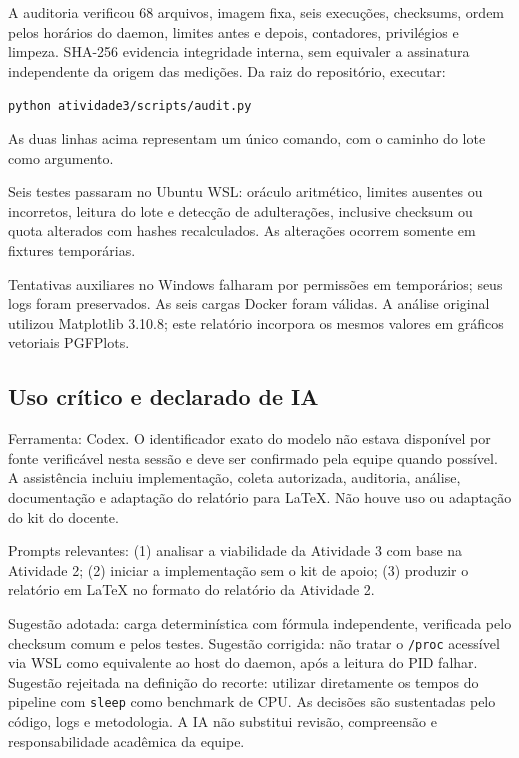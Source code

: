 \documentclass[12pt,a4paper]{article}
\begin{document}
A auditoria verificou 68 arquivos, imagem fixa, seis execuções, checksums, ordem pelos horários do daemon, limites antes e depois, contadores, privilégios e limpeza. SHA-256 evidencia integridade interna, sem equivaler a assinatura independente da origem das medições. Da raiz do repositório, executar:
\begin{singlespace}\small\noindent
\texttt{python atividade3/scripts/audit.py}\\
\end{singlespace}
As duas linhas acima representam um único comando, com o caminho do lote como argumento.

Seis testes passaram no Ubuntu WSL: oráculo aritmético, limites ausentes ou incorretos, leitura do lote e detecção de adulterações, inclusive checksum ou quota alterados com hashes recalculados. As alterações ocorrem somente em fixtures temporárias.

Tentativas auxiliares no Windows falharam por permissões em temporários; seus logs foram preservados. As seis cargas Docker foram válidas. A análise original utilizou Matplotlib 3.10.8; este relatório incorpora os mesmos valores em gráficos vetoriais PGFPlots.

\subsection{Uso crítico e declarado de IA}\label{sec:ia}
Ferramenta: Codex. O identificador exato do modelo não estava disponível por fonte verificável nesta sessão e deve ser confirmado pela equipe quando possível. A assistência incluiu implementação, coleta autorizada, auditoria, análise, documentação e adaptação do relatório para LaTeX. Não houve uso ou adaptação do kit do docente.

Prompts relevantes: (1) analisar a viabilidade da Atividade 3 com base na Atividade 2; (2) iniciar a implementação sem o kit de apoio; (3) produzir o relatório em LaTeX no formato do relatório da Atividade 2.

Sugestão adotada: carga determinística com fórmula independente, verificada pelo checksum comum e pelos testes. Sugestão corrigida: não tratar o \texttt{/proc} acessível via WSL como equivalente ao host do daemon, após a leitura do PID falhar. Sugestão rejeitada na definição do recorte: utilizar diretamente os tempos do pipeline com \texttt{sleep} como benchmark de CPU. As decisões são sustentadas pelo código, logs e metodologia. A IA não substitui revisão, compreensão e responsabilidade acadêmica da equipe.
\end{document}
